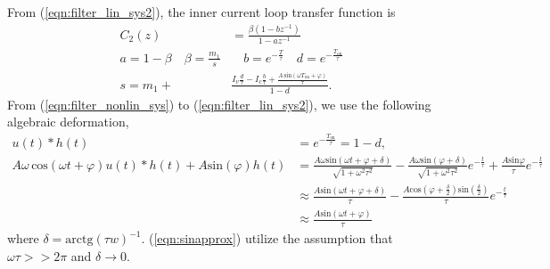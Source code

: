 From (\ref{eqn:filter_lin_sys2}), the inner current loop transfer function is 
\begin{align} \label{eqn:filter_ztransform}
    \label{iltf1} C_2(z) &= \frac{\beta (1-b  z^{-1})}{1-a  z^{-1}}\\
    a = 1 - \beta \quad \beta = \frac{m_1}{s} & \quad b = e^{-\frac{T}{\tau}} \quad d = e^{-\frac{T_{\text{on}}}{\tau}} \nonumber \\
    \label{eqn:transzparam} s = m_1 +  &\frac{I_v \frac{d}{\tau} - I_c \frac{b}{\tau} + \frac{A\, \text{sin}(\omega T_{\text{on}}+\varphi)}{\tau}}{1-d}.
\end{align}
From (\ref{eqn:filter_nonlin_sys}) to (\ref{eqn:filter_lin_sys2}), we use the following algebraic deformation,
\begin{align} 
    \label{eqn:uhconv} u(t)*h(t) &= e^{-\frac{T_{\text{on}}}{\tau}} = 1-d, \\
    \label{eqn:sinapprox} A \omega\, \text{cos}(\omega  t+\varphi) u(t) * h(t) + A \text{sin}(\varphi) h(t) &=  \frac{A \omega \text{sin}(\omega t + \varphi + \delta)}{\sqrt{1+\omega^2\tau^2}} - \frac{A \omega \text{sin}( \varphi + \delta)}{\sqrt{1+\omega^2\tau^2}} e^{-\frac{t}{\tau}} + \frac{A \text{sin} \varphi}{\tau} e^{-\frac{t}{\tau}} \nonumber \\
     & \approx \frac{A \text{sin}(\omega t + \varphi + \delta)}{\tau} - \frac{A \text{cos}( \varphi + \frac{\delta}{2}) \text{sin} (\frac{\delta}{2})}{\tau} e^{-\frac{t}{\tau}}  \nonumber \\
     &\approx \frac{A \text{sin}(\omega t + \varphi)}{\tau}
\end{align}
where $\delta = \text{arctg}(\tau w)^{-1}$. (\ref{eqn:sinapprox}) utilize the assumption that $\omega \tau >> 2 \pi$ and $\delta \rightarrow 0$.

